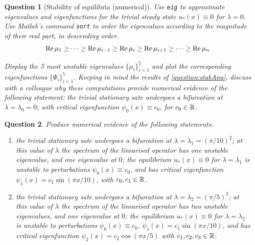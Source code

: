 \documentclass[a4paper]{siamart220329}
\theoremstyle{plain}
\newtheorem{question}{Question}
\begin{document}
\begin{question}[Stability of equilibria (numerical)]
Use \lstinline|eig| to approximate eigenvalues and eigenfunctions for the trivial steady state
$u_*(x) \equiv 0$ for $\lambda = 0$. Use Matlab's command \lstinline|sort| to order
the eigenvalues according to the magnitude of their real part, in descending order.
\[
  \operatorname{Re} \mu_1 \geq \cdots \geq \operatorname{Re} \mu_{i-1} \geq \operatorname{Re} \mu_{i} \geq \operatorname{Re}
  \mu_{i+1} \geq \cdots \geq \operatorname{Re} \mu_n
\]

Display the 5 most unstable eigenvalues $\{ \mu_i \}_{i=1}^5$ and plot the
corresponding eigenfunctions $\{\Psi_i\}_{i=1}^5$. Keeping in mind the results of
\cref{question:stabAna}, discuss with a colleague why these computations provide
numerical evidence of the following statement: 
\textit{the trivial stationary sate undergoes a bifurcation at $\lambda = \lambda_0 =
  0$, with critical eigenfunction $\psi_0(x) \equiv c_0$, for $c_0 \in \mathbb{R}$.}

\end{question}

\begin{question}\label{question:trivialInstabilities}
  Produce numerical evidence of the following statements:
 \begin{enumerate}
    \item the trivial stationary sate undergoes a bifurcation at $\lambda = \lambda_1 =
    (\pi/10)^2$; at this value of $\lambda$ the spectrum of the linearised operator has
    one unstable eigenvalue, and one eigenvalue at $0$; the equilibrium
    $u_*(x) \equiv 0$ for $\lambda = \lambda_1$ is unstable to perturbations
  $\psi_0(x) \equiv c_0$, and has critical eigenfunction $\psi_1(x) = c_1 \sin(
  \pi x/10)$, with $c_0,c_1 \in
  \mathbb{R}$.

  \item the trivial stationary sate undergoes a bifurcation at $\lambda = \lambda_2 =
      (\pi/5)^2$; at this value of $\lambda$ the spectrum of the linearised operator has
      two unstable eigenvalues, and one eigenvalue at $0$; the equilibrium
      $u_*(x) \equiv 0$ for $\lambda = \lambda_2$ is unstable to perturbations
    $\psi_0(x) \equiv c_0$, $\psi_1(x) = c_1 \sin( \pi x/10)$, and has critical
    eigenfunction $\psi_2(x) = c_2 \cos( \pi x/5)$ with $c_1,c_2,c_3 \in \mathbb{R}$.
  \end{enumerate}

\end{question}
\end{document}
